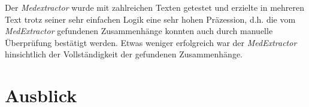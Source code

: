 Der \emph{Medextractor} wurde mit zahlreichen Texten getestet und erzielte in mehreren Text trotz seiner sehr einfachen Logik eine sehr hohen Präzession, d.h. die vom \emph{MedExtractor} gefundenen Zusammenhänge konnten auch durch manuelle Überprüfung bestätigt werden. Etwas weniger erfolgreich war der \emph{MedExtractor} hinsichtlich der Vollständigkeit der gefundenen Zusammenhänge.


\section{Ausblick}
\label{sec:Ausblick} 